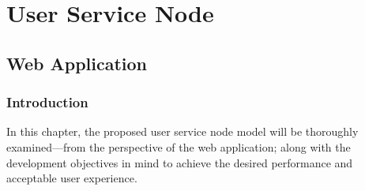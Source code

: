 \newpage
\part{User Service Node}
\newpage
\chapter{Web Application}
\label{ch:5}

\section{Introduction}
In this chapter, the proposed user service node model will be thoroughly examined---from the perspective of the web application; along with the development objectives in mind to achieve the desired performance and acceptable user experience.


